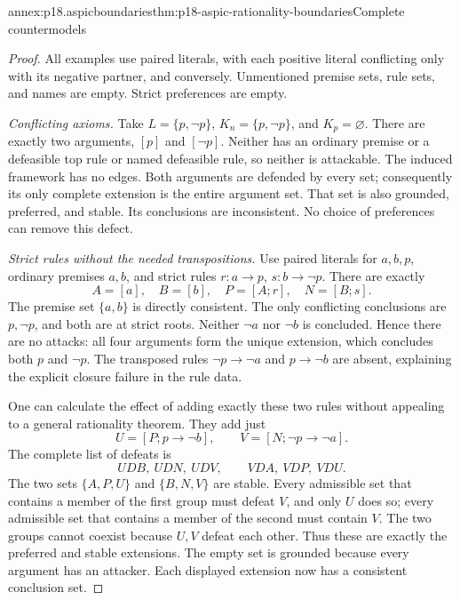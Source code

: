 \begin{annexitem}{annex:p18.aspicboundaries}{thm:p18-aspic-rationality-boundaries}{Complete countermodels}
\begin{proof}
All examples use paired literals, with each positive literal conflicting
only with its negative partner, and conversely. Unmentioned premise sets,
rule sets, and names are empty. Strict preferences are empty.

\emph{Conflicting axioms.}
Take \(L=\{p,\neg p\}\), \(K_n=\{p,\neg p\}\), and \(K_p=\varnothing\).
There are exactly two arguments, \([p]\) and \([\neg p]\).
Neither has an ordinary premise or a defeasible top rule or named
defeasible rule, so neither is attackable. The induced framework has no
edges. Both arguments are defended by every set; consequently its only
complete extension is the entire argument set. That set is also grounded,
preferred, and stable. Its conclusions are inconsistent. No choice of
preferences can remove this defect.

\emph{Strict rules without the needed transpositions.}
Use paired literals for \(a,b,p\), ordinary premises \(a,b\), and strict
rules \(r:a\to p\), \(s:b\to\neg p\). There are exactly
\[
 A=[a],\quad B=[b],\quad P=[A;r],\quad N=[B;s].
\]
The premise set \(\{a,b\}\) is directly consistent.
The only conflicting conclusions are \(p,\neg p\), and both are at
strict roots. Neither \(\neg a\) nor \(\neg b\) is concluded.
Hence there are no attacks: all four arguments form the unique extension,
which concludes both \(p\) and \(\neg p\).
The transposed rules \(\neg p\to\neg a\) and \(p\to\neg b\)
are absent, explaining the explicit closure failure in the rule data.

One can calculate the effect of adding exactly these two rules without
appealing to a general rationality theorem. They add just
\[
 U=[P;p\to\neg b],\qquad V=[N;\neg p\to\neg a].
\]
The complete list of defeats is
\[
 U D B,\ U D N,\ U D V,\qquad
 V D A,\ V D P,\ V D U .
\]
The two sets \(\{A,P,U\}\) and \(\{B,N,V\}\) are stable.
Every admissible set that contains a member of the first group must
defeat \(V\), and only \(U\) does so; every admissible set that contains
a member of the second must contain \(V\).
The two groups cannot coexist because \(U,V\) defeat each other.
Thus these are exactly the preferred and stable extensions.
The empty set is grounded because every argument has an attacker.
Each displayed extension now has a consistent conclusion set.


\end{proof}
\end{annexitem}
